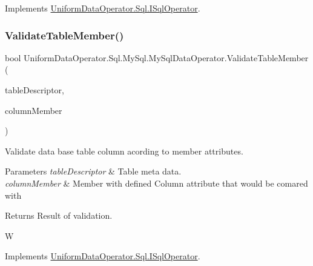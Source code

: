 Implements \mbox{\hyperlink{interface_uniform_data_operator_1_1_sql_1_1_i_sql_operator_af43c4421b85e52d180763871be8147f6}{Uniform\+Data\+Operator.\+Sql.\+I\+Sql\+Operator}}.

\mbox{\label{class_uniform_data_operator_1_1_sql_1_1_my_sql_1_1_my_sql_data_operator_a233ab791c68b93aded97bfd9986767e8}} 
\subsubsection{\texorpdfstring{Validate\+Table\+Member()}{ValidateTableMember()}}
{\footnotesize\ttfamily bool Uniform\+Data\+Operator.\+Sql.\+My\+Sql.\+My\+Sql\+Data\+Operator.\+Validate\+Table\+Member (\begin{DoxyParamCaption}\item[{\mbox{\hyperlink{class_uniform_data_operator_1_1_sql_1_1_tables_1_1_attributes_1_1_table}{Table}}}]{table\+Descriptor,  }\item[{Member\+Info}]{column\+Member }\end{DoxyParamCaption})}



Validate data base table column acording to member attributes. 


\begin{DoxyParams}{Parameters}
{\em table\+Descriptor} & Table meta data.\\
\hline
{\em column\+Member} & Member with defined Column attribute that would be comared with \\
\hline
\end{DoxyParams}
\begin{DoxyReturn}{Returns}
Result of validation.
\end{DoxyReturn}
W 

Implements \mbox{\hyperlink{interface_uniform_data_operator_1_1_sql_1_1_i_sql_operator_a3b5fbe97e664e1ef689576ab8757f957}{Uniform\+Data\+Operator.\+Sql.\+I\+Sql\+Operator}}.



